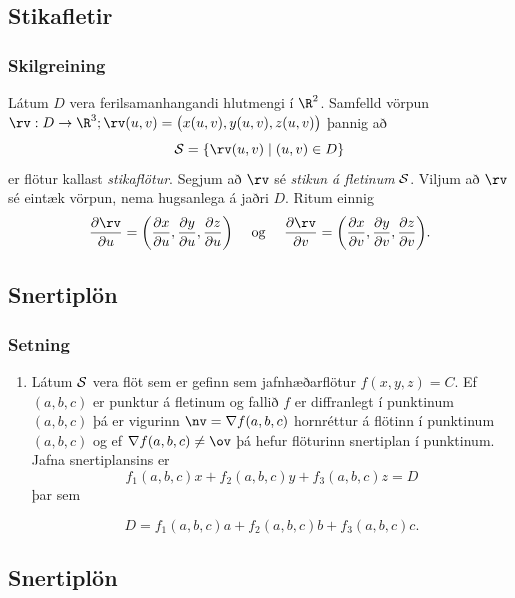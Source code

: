 \subsection{Stikafletir} 

\subsubsection{Skilgreining  \rtask{}}

Látum $D$ vera ferilsamanhangandi hlutmengi í $\R^2$.  Samfelld vörpun
$\rv:D\rightarrow \R^3; \rv (u,v)=\big(x(u,v), y(u,v), z(u,v)\big)$  
þannig að  
$${\cal S}=\{\rv(u,v)\mid (u,v)\in D\}$$
er flötur kallast {\em stikaflötur}.  Segjum að $\rv$ sé {\em stikun á
  fletinum} $\cal S$. 
Viljum að $\rv$ sé eintæk vörpun, nema hugsanlega á jaðri $D$.
Ritum einnig 
$$\frac{\partial \rv}{\partial u}=
\bigg(\frac{\partial x}{\partial u}, \frac{\partial y}{\partial u},
\frac{\partial z}{\partial u}\bigg)\quad\mbox{ og }\quad
\frac{\partial \rv}{\partial v}=
\bigg(\frac{\partial x}{\partial v}, \frac{\partial y}{\partial v},
\frac{\partial z}{\partial v}\bigg).$$





\subsection{Snertiplön} 

\subsubsection{Setning  }
\begin {enumerate}
 \item  Látum $\cal S$ vera flöt sem er gefinn sem jafnhæðarflötur 
     $f(x,y,z)=C$.   Ef $(a, b, c)$ er punktur á fletinum og
     fallið $f$ er diffranlegt í punktinum $(a, b,c)$ þá er vigurinn
     $\nv=\nabla f(a, b, c)$ hornréttur á flötinn í punktinum $(a,
    b, c)$ og ef $\nabla f(a, b, c)\neq \ov$ þá hefur
flöturinn snertiplan í punktinum.  Jafna
     snertiplansins er
$$f_1(a, b, c)x+f_2(a, b, c)y+f_3(a, b, c)z=D$$ 
þar sem 

$$D= f_1(a, b, c)a+f_2(a, b, c)b
+f_3(a, b, c)c.$$

\end {enumerate}





\subsection{Snertiplön}
